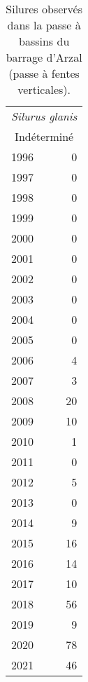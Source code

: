 \begin{table}[ht]
\centering
\begin{tabular}{lr}
  \toprule
  \multicolumn{2}{c}{\textit{Silurus glanis}}  \\
						\multicolumn{2}{c}{Indéterminé} \\ \midrule
1996 & 0 \\ 
  1997 & 0 \\ 
  1998 & 0 \\ 
  1999 & 0 \\ 
  2000 & 0 \\ 
  2001 & 0 \\ 
  2002 & 0 \\ 
  2003 & 0 \\ 
  2004 & 0 \\ 
  2005 & 0 \\ 
  2006 & 4 \\ 
  2007 & 3 \\ 
  2008 & 20 \\ 
  2009 & 10 \\ 
  2010 & 1 \\ 
  2011 & 0 \\ 
  2012 & 5 \\ 
  2013 & 0 \\ 
  2014 & 9 \\ 
  2015 & 16 \\ 
  2016 & 14 \\ 
  2017 & 10 \\ 
  2018 & 56 \\ 
  2019 & 9 \\ 
  2020 & 78 \\ 
  2021 & 46 \\ 
   \bottomrule
\end{tabular}
\caption{Silures observés dans la passe à bassins du barrage
				d'Arzal (passe à fentes verticales).} 
\label{table_bilanannuel_sil}
\end{table}
